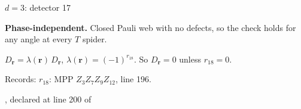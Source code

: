 \label{d3_det017}
{\Large $d=3$: detector 17}\par
\textbf{Phase-independent.} Closed Pauli web with no defects, so the check holds for any angle at every $T$ spider.
\begin{center}
\end{center}
\vspace{-1mm}
$D_{\boldsymbol r}=\lambda(\boldsymbol r)\,D_{\boldsymbol r}$, \quad $\lambda(\boldsymbol r)=(-1)^{r_{18}}$. \qquad So $D_{\boldsymbol r}=0$ unless $r_{18}=0$.
\par\smallskip\begin{minipage}{.98\linewidth}\small Records: $r_{18}$: MPP $Z_{3}Z_{7}Z_{9}Z_{12}$, line 196.\end{minipage}
\vfill
{\footnotesize\texttt{}, declared at line 200 of \texttt{}}
\newpage

